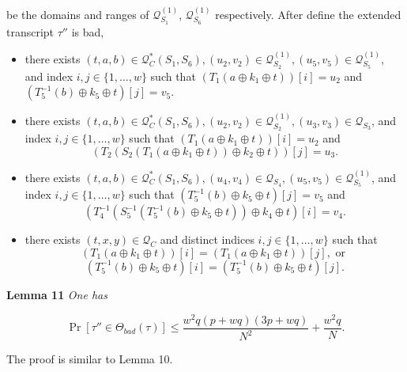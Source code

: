 \noindent be the domains and ranges of $\mathcal{Q}_{S_{1}}^{(1)}$, $\mathcal{Q}_{S_{6}}^{(1)}$ respectively. After define the extended transcript $\tau''$ is bad, \\

\begin{itemize}
  \item[\feai]
  there exists $(t, a, b) \in \mathcal{Q}_{C}^{*}\left(S_{1}, S_{6}\right), \left(u_{2}, v_{2}\right) \in \mathcal{Q}_{S_{2}}^{(1)}, \left(u_{5}, v_{5}\right) \in \mathcal{Q}_{S_{5}}^{(1)}$, and index $i, j \in \{1, \ldots, w\}$ such that $(T_1\left(a \oplus k_{1} \oplus t\right))[i]=u_2$ and $(T_5^{-1}\left(b\right) \oplus k_{5} \oplus t)[j]=v_5$.
  \item[\feaii]
  there exists $(t, a, b) \in \mathcal{Q}_{C}^{*}\left(S_{1}, S_{6}\right), \left(u_{2}, v_{2}\right) \in \mathcal{Q}_{S_{2}}^{(1)}, \left(u_{3}, v_{3}\right) \in \mathcal{Q}_{S_{3}}$, and index $i, j \in \{1, \ldots, w\}$ such that $(T_1\left(a \oplus k_{1} \oplus t\right))[i]=u_2$ and 
  $$
  \left(T_{2}\left(S_{2}\left(T_1(a \oplus k_{1} \oplus t)\right) \oplus k_{2} \oplus t\right)\right)[j]=u_3.
  $$
  \item[\feaiii]
  there exists $(t, a, b) \in \mathcal{Q}_{C}^{*}\left(S_{1}, S_{6}\right), \left(u_{4}, v_{4}\right) \in \mathcal{Q}_{S_{4}}, \left(u_{5}, v_{5}\right) \in \mathcal{Q}_{S_{5}}^{(1)}$, and index $i, j \in \{1, \ldots, w\}$ such that $(T_5^{-1}\left(b\right) \oplus k_{5} \oplus t)[j]=v_5$ and 
  $$
  \left(T_{4}^{-1}\left(S_{5}^{-1}\left(T_5^{-1}(b) \oplus k_{5} \oplus t\right)\right) \oplus k_{4} \oplus t\right)[i]=v_4.
  $$
  \item[\feaiv]
  there exists $(t, x, y) \in \mathcal{Q}_{C}$ and distinct indices $i, j \in \{1, \ldots, w\}$ such that 
  $$(T_1\left(a \oplus k_{1} \oplus t\right))[i]=(T_1\left(a \oplus k_{1} \oplus t\right))[j], \text{ or }$$
  $$(T_5^{-1}\left(b\right) \oplus k_{5} \oplus t)[i]=(T_5^{-1}\left(b\right) \oplus k_{5} \oplus t)[j].$$
\end{itemize}

\noindent \textbf{Lemma 11} \emph{One has}

\begin{equation}
\operatorname{Pr}[\tau'' \in \Theta_{bad}(\tau)] \leq \frac{w^2 q (p+w q) (3 p +w q)}{N^{2}} + \frac{w^{2} q}{N}.
\end{equation}

\noindent The proof is similar to Lemma 10.\\

